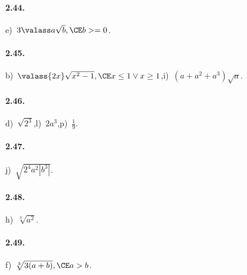 \paragraph{2.44.}
e)~$3\valass a\sqrt b, \CE b>=0$.

\paragraph{2.45.}
b)~$\valass{2x}\sqrt{x^2-1}, \CE x\le 1\vee x\ge 1$,\quad i)~$(a+a^2+a^3)\sqrt a$.

\paragraph{2.46.}
d)~$\sqrt{2^3}$,\quad l)~$2a^3$,\quad p)~$\frac 1 9$.

\paragraph{2.47.}
j)~$\sqrt{2^4a^2\left|b^3\right|}$.

\paragraph{2.48.}
h)~$\sqrt[3]{a^2}$.

\paragraph{2.49.}
f)~$\sqrt[3]{3(a+b)}, \CE a>b$.

